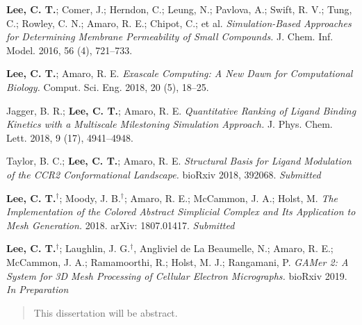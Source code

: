 \begin{frontmatter}
\begin{vitapage}
\begin{publications}
  \item \textbf{Lee, C. T.}; Comer, J.; Herndon, C.; Leung, N.; Pavlova, A.; Swift, R. V.; Tung, C.; Rowley, C. N.; Amaro, R. E.; Chipot, C.; et al. \emph{Simulation-Based Approaches for Determining Membrane Permeability of Small Compounds.} J. Chem. Inf. Model. 2016, 56 (4), 721–733.
  \item \textbf{Lee, C. T.}; Amaro, R. E. \emph{Exascale Computing: A New Dawn for Computational Biology.} Comput. Sci. Eng. 2018, 20 (5), 18–25.
  \item Jagger, B. R.; \textbf{Lee, C. T.}; Amaro, R. E. \emph{Quantitative Ranking of Ligand Binding Kinetics with a Multiscale Milestoning Simulation Approach.} J. Phys. Chem. Lett. 2018, 9 (17), 4941–4948.
  \item Taylor, B. C.; \textbf{Lee, C. T.}; Amaro, R. E. \emph{Structural Basis for Ligand Modulation of the CCR2 Conformational Landscape.} bioRxiv 2018, 392068. \textit{Submitted}
  \item \textbf{Lee, C. T.$^{\dagger}$}; Moody, J. B.$^{\dagger}$; Amaro, R. E.; McCammon, J. A.; Holst, M. \emph{The Implementation of the Colored Abstract Simplicial Complex and Its Application to Mesh Generation.} 2018. arXiv: 1807.01417. \textit{Submitted}
  \item \textbf{Lee, C. T.$^{\dagger}$}; Laughlin, J. G.$^{\dagger}$, Angliviel de La Beaumelle, N.; Amaro, R. E.; McCammon, J. A.; Ramamoorthi, R.; Holst, M. J.; Rangamani, P. \emph{GAMer 2: A System for 3D Mesh Processing of Cellular Electron Micrographs.} bioRxiv 2019. \textit{In Preparation}
\end{publications}
\end{vitapage}

%
%
\begin{abstract}
  This dissertation will be abstract.
\end{abstract}
\end{frontmatter}
